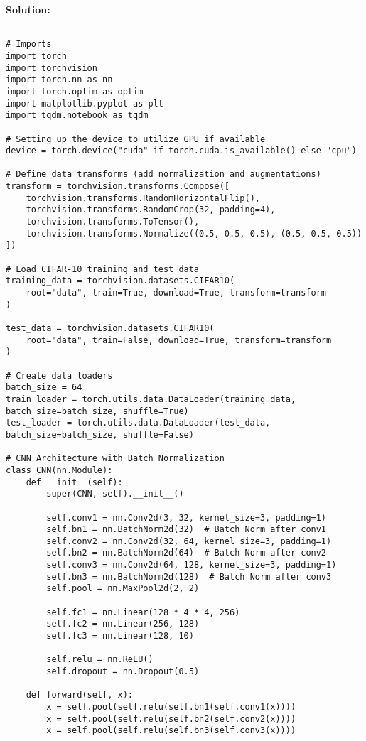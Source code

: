 \documentclass{article}
\newenvironment{solution}{\color{blue} \smallskip \textbf{Solution:}}{}
\begin{document}
\begin{solution}
\begin{verbatim}

# Imports
import torch
import torchvision
import torch.nn as nn
import torch.optim as optim
import matplotlib.pyplot as plt
import tqdm.notebook as tqdm

# Setting up the device to utilize GPU if available
device = torch.device("cuda" if torch.cuda.is_available() else "cpu")

# Define data transforms (add normalization and augmentations)
transform = torchvision.transforms.Compose([
    torchvision.transforms.RandomHorizontalFlip(),
    torchvision.transforms.RandomCrop(32, padding=4),
    torchvision.transforms.ToTensor(),
    torchvision.transforms.Normalize((0.5, 0.5, 0.5), (0.5, 0.5, 0.5))
])

# Load CIFAR-10 training and test data
training_data = torchvision.datasets.CIFAR10(
    root="data", train=True, download=True, transform=transform
)

test_data = torchvision.datasets.CIFAR10(
    root="data", train=False, download=True, transform=transform
)

# Create data loaders
batch_size = 64
train_loader = torch.utils.data.DataLoader(training_data, batch_size=batch_size, shuffle=True)
test_loader = torch.utils.data.DataLoader(test_data, batch_size=batch_size, shuffle=False)

# CNN Architecture with Batch Normalization
class CNN(nn.Module):
    def __init__(self):
        super(CNN, self).__init__()
        
        self.conv1 = nn.Conv2d(3, 32, kernel_size=3, padding=1)
        self.bn1 = nn.BatchNorm2d(32)  # Batch Norm after conv1
        self.conv2 = nn.Conv2d(32, 64, kernel_size=3, padding=1)
        self.bn2 = nn.BatchNorm2d(64)  # Batch Norm after conv2
        self.conv3 = nn.Conv2d(64, 128, kernel_size=3, padding=1)
        self.bn3 = nn.BatchNorm2d(128)  # Batch Norm after conv3
        self.pool = nn.MaxPool2d(2, 2)
        
        self.fc1 = nn.Linear(128 * 4 * 4, 256)
        self.fc2 = nn.Linear(256, 128)
        self.fc3 = nn.Linear(128, 10)
        
        self.relu = nn.ReLU()
        self.dropout = nn.Dropout(0.5)

    def forward(self, x):
        x = self.pool(self.relu(self.bn1(self.conv1(x))))
        x = self.pool(self.relu(self.bn2(self.conv2(x))))
        x = self.pool(self.relu(self.bn3(self.conv3(x))))
        

\end{verbatim}
\end{solution}
\end{document}
